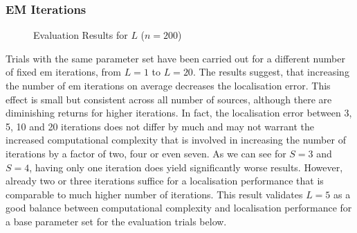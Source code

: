 \subsubsection*{EM Iterations}

\begin{figure}[H]
\iftoggle{quick}{%
   \texttt{[image: plots/boxplots/boxplot-joined-em]}
}{%
   
}
	\caption[Evaluation Results for $L$]{Evaluation Results for $L$ ($n=200$)}
	\label{fig:trialEM}
\end{figure}

Trials with the same parameter set have been carried out for a different number of fixed \gls{em} iterations, from $L=1$ to $L=20$. The results suggest, that increasing the number of \gls{em} iterations on average decreases the localisation error. This effect is small but consistent across all number of sources, although there are diminishing returns for higher iterations. In fact, the localisation error between 3, 5, 10 and 20 iterations does not differ by much and may not warrant the increased computational complexity that is involved in increasing the number of iterations by a factor of two, four or even seven. As we can see for $S=3$ and $S=4$, having only one iteration does yield significantly worse results. However, already two or three iterations suffice for a localisation performance that is comparable to much higher number of iterations. This result validates $L=5$ as a good balance between computational complexity and localisation performance for a base parameter set for the evaluation trials below.

%    
